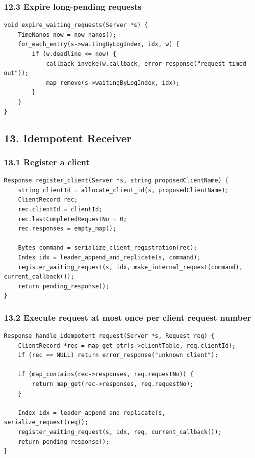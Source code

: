 \documentclass[10pt,letterpaper]{article}
\begin{document}
\subsubsection*{12.3 Expire long-pending requests}

\begin{verbatim}
void expire_waiting_requests(Server *s) {
    TimeNanos now = now_nanos();
    for_each_entry(s->waitingByLogIndex, idx, w) {
        if (w.deadline <= now) {
            callback_invoke(w.callback, error_response("request timed out"));
            map_remove(s->waitingByLogIndex, idx);
        }
    }
}
\end{verbatim}

\subsection*{13. Idempotent Receiver}

\subsubsection*{13.1 Register a client}

\begin{verbatim}
Response register_client(Server *s, string proposedClientName) {
    string clientId = allocate_client_id(s, proposedClientName);
    ClientRecord rec;
    rec.clientId = clientId;
    rec.lastCompletedRequestNo = 0;
    rec.responses = empty_map();

    Bytes command = serialize_client_registration(rec);
    Index idx = leader_append_and_replicate(s, command);
    register_waiting_request(s, idx, make_internal_request(command), current_callback());
    return pending_response();
}
\end{verbatim}

\subsubsection*{13.2 Execute request at most once per client request number}

\begin{verbatim}
Response handle_idempotent_request(Server *s, Request req) {
    ClientRecord *rec = map_get_ptr(s->clientTable, req.clientId);
    if (rec == NULL) return error_response("unknown client");

    if (map_contains(rec->responses, req.requestNo)) {
        return map_get(rec->responses, req.requestNo);
    }

    Index idx = leader_append_and_replicate(s, serialize_request(req));
    register_waiting_request(s, idx, req, current_callback());
    return pending_response();
}
\end{verbatim}
\end{document}
